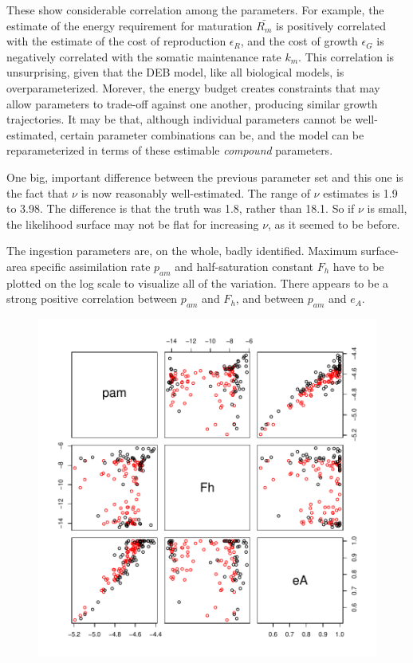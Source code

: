 \documentclass[12pt,reqno,final]{amsart}
\theoremstyle{plain}
\numberwithin{equation}{part}
\begin{document}
These show considerable correlation among the parameters. For example,
the estimate of the energy requirement for maturation $\bar{R_m}$ is
positively correlated with the estimate of the cost of
reproduction $\epsilon_R$, and the cost of growth $\epsilon_G$ is
negatively correlated with the somatic maintenance rate $k_m$. This
correlation is unsurprising, given that the DEB model, like
all biological models, is overparameterized. Morever, the energy
budget creates constraints that may allow parameters to trade-off
against one another, producing similar growth trajectories. It may be
that, although individual parameters cannot be well-estimated, certain
parameter combinations can be, and the model can be reparameterized in
terms of these estimable \emph{compound} parameters.

One big, important difference between the previous parameter set and
this one is the fact that $\nu$ is now reasonably well-estimated. The
range of $\nu$ estimates is 1.9 to 3.98. The difference is that the
truth was 1.8, rather than 18.1. So if $\nu$ is small, the likelihood
surface may not be flat for increasing $\nu$, as it seemed to be
before.

The ingestion parameters are, on the whole, badly identified. Maximum
surface-area specific assimilation rate $p_{am}$ and half-saturation
constant $F_h$ have to be plotted on the log scale to visualize all of
the variation. There appears to be a strong positive correlation
between $p_{am}$ and $F_h$, and between $p_{am}$ and $e_A$.

\begin{figure}
\includegraphics{Solving_the_problem_of_parameter_covariation_3-002}
\end{figure}
\end{document}
